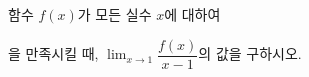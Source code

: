 함수 $f(x)$가 모든 실수 $x$에 대하여 \par\smallskip{}\par\smallskip\noindent 을 만족시킬 때, $\displaystyle\lim_{x\to 1} \dfrac{f(x)}{x-1}$의 값을 구하시오.
